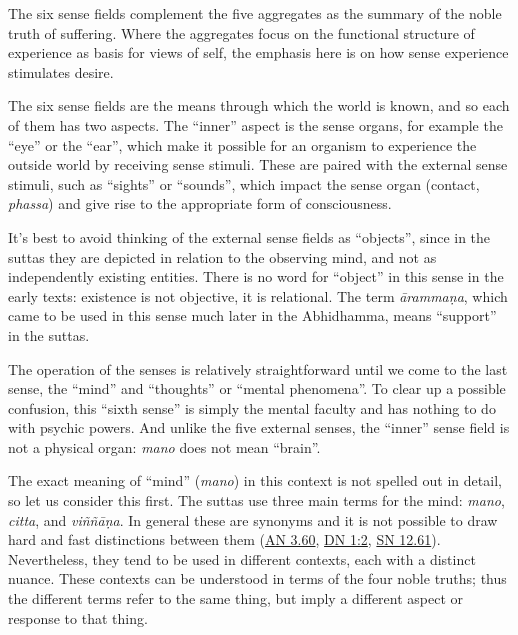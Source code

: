 \documentclass[12pt,openany]{book}%
\begin{document}
The six sense fields complement the five aggregates as the summary of the noble truth of suffering. Where the aggregates focus on the functional structure of experience as basis for views of self, the emphasis here is on how sense experience stimulates desire.

The six sense fields are the means through which the world is known, and so each of them has two aspects. The “inner” aspect is the sense organs, for example the “eye” or the “ear”, which make it possible for an organism to experience the outside world by receiving sense stimuli. These are paired with the external sense stimuli, such as “sights” or “sounds”, which impact the sense organ (contact, \textit{phassa}) and give rise to the appropriate form of consciousness.

It’s best to avoid thinking of the external sense fields as “objects”, since in the suttas they are depicted in relation to the observing mind, and not as independently existing entities. There is no word for “object” in this sense in the early texts: existence is not objective, it is relational. The term \textit{\textsanskrit{ārammaṇa}}, which came to be used in this sense much later in the Abhidhamma, means “support” in the suttas.

The operation of the senses is relatively straightforward until we come to the last sense, the “mind” and “thoughts” or “mental phenomena”. To clear up a possible confusion, this “sixth sense” is simply the mental faculty and has nothing to do with psychic powers. And unlike the five external senses, the “inner” sense field is not a physical organ: \textit{mano} does not mean “brain”.

The exact meaning of “mind” (\textit{mano}) in this context is not spelled out in detail, so let us consider this first. The suttas use three main terms for the mind: \textit{mano}, \textit{citta}, and \textit{\textsanskrit{viññāṇa}}. In general these are synonyms and it is not possible to draw hard and fast distinctions between them (\href{https://suttacentral.net/an3.60}{AN 3.60}, \href{https://suttacentral.net/dn1\#2}{DN 1:2}, \href{https://suttacentral.net/sn12.61}{SN 12.61}). Nevertheless, they tend to be used in different contexts, each with a distinct nuance. These contexts can be understood in terms of the four noble truths; thus the different terms refer to the same thing, but imply a different aspect or response to that thing.
\end{document}
